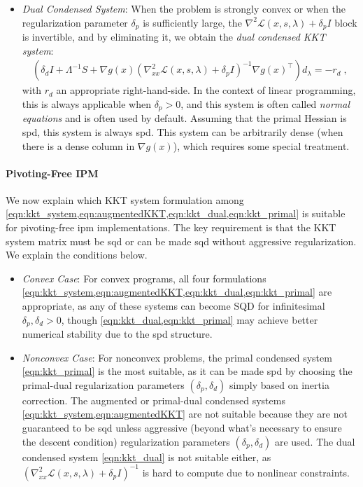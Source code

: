 \documentclass{article}
\begin{document}
\begin{itemize}[leftmargin=*,itemsep=0pt,parsep=0pt,partopsep=0pt]
\item \textit{Dual Condensed System}:
When the problem is strongly convex or when the regularization parameter $\delta_p$ is sufficiently large, the $\nabla^2 \mathcal{L}(x,s,\lambda) + \delta_p I$ block is invertible, and by eliminating it, we obtain the \emph{dual condensed KKT system}:
\begin{align}\label{eqn:kkt_dual}
  \left(\delta_d I + \Lambda^{-1}S + \nabla g(x)\left(\nabla_{x x}^2 \mathcal{L}(x,s,\lambda) + \delta_p I\right)^{-1} \nabla g(x)^\top\right)
  d_\lambda = - r_d \; ,
\end{align}
with $r_d$ an appropriate right-hand-side.
In the context of linear programming, this is always applicable when $\delta_p>0$, and this system is often called \emph{normal equations} and is often used by default.
Assuming that the primal Hessian is \gls*{spd}, this system is always \gls*{spd}.
This system can be arbitrarily dense (when there is a dense column in $\nabla g(x)$), which requires some special treatment.
\end{itemize}


\paragraph{Pivoting-Free IPM}
We now explain which KKT system formulation among \cref{eqn:kkt_system,eqn:augmentedKKT,eqn:kkt_dual,eqn:kkt_primal} is suitable for pivoting-free \gls*{ipm} implementations. The key requirement is that the KKT system matrix must be \gls*{sqd} or can be made \gls*{sqd} without aggressive regularization. We explain the conditions below.
\begin{itemize}[leftmargin=*,itemsep=0pt,parsep=0pt,partopsep=0pt]
\item \textit{Convex Case}:
  For convex programs, all four formulations \cref{eqn:kkt_system,eqn:augmentedKKT,eqn:kkt_dual,eqn:kkt_primal} are appropriate, as any of these systems can become SQD for infinitesimal $\delta_p, \delta_d > 0$, though \cref{eqn:kkt_dual,eqn:kkt_primal} may achieve better numerical stability due to the \gls*{spd} structure. 
\item \textit{Nonconvex Case}:
  For nonconvex problems, the primal condensed system \cref{eqn:kkt_primal} is the most suitable, as it can be made \gls*{spd} by choosing the primal-dual regularization parameters $(\delta_p, \delta_d)$ simply based on inertia correction.
  The augmented or primal-dual condensed systems \cref{eqn:kkt_system,eqn:augmentedKKT} are not suitable because they are not guaranteed to be \gls*{sqd} unless {aggressive} (beyond what's necessary to ensure the descent condition) regularization parameters $(\delta_p, \delta_d)$ are used.
  The dual condensed system \cref{eqn:kkt_dual} is not suitable either, as $(\nabla^2_{x x} \mathcal{L}(x,s,\lambda) + \delta_p I)^{-1}$ is hard to compute due to nonlinear constraints.
\end{itemize}
\end{document}

